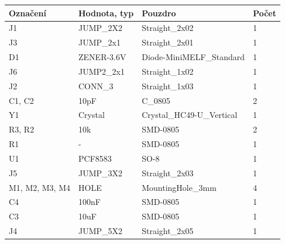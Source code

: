 \begin{center}
  \begin{tabular}{ | l | l | l | l |}
    \hline
    Označení & Hodnota, typ & Pouzdro & Počet \\ \hline
    \hline
			J1 & JUMP\_2X2 & Straight\_2x02 & 1\\ \hline
			J3 & JUMP\_2x1 & Straight\_2x01 & 1\\ \hline
			D1 & ZENER-3.6V & Diode-MiniMELF\_Standard & 1\\ \hline
			J6 & JUMP2\_2x1 & Straight\_1x02 & 1\\ \hline
			J2 & CONN\_3 & Straight\_1x03 & 1\\ \hline
			C1, C2 & 10pF & C\_0805 & 2\\ \hline
			Y1 & Crystal & Crystal\_HC49-U\_Vertical & 1\\ \hline
			R3, R2 & 10k & SMD-0805 & 2\\ \hline
			R1 & - & SMD-0805 & 1\\ \hline
			U1 & PCF8583 & SO-8 & 1\\ \hline
			J5 & JUMP\_3X2 & Straight\_2x03 & 1\\ \hline
			M1, M2, M3, M4 & HOLE & MountingHole\_3mm & 4\\ \hline
			C4 & 100nF & SMD-0805 & 1\\ \hline
			C3 & 10uF & SMD-0805 & 1\\ \hline
			J4 & JUMP\_5X2 & Straight\_2x05 & 1\\ \hline
	
  \end{tabular}
\end{center}